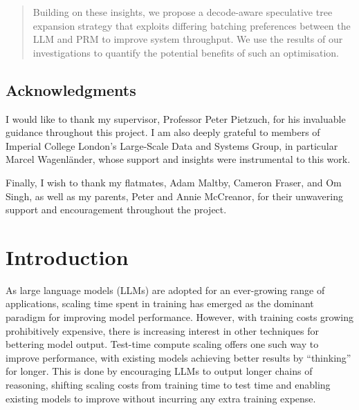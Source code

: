 \documentclass[11pt,twoside]{report}
\begin{document}
\begin{abstract}
Building on these insights, we propose a decode-aware speculative tree expansion strategy that exploits differing batching preferences between the LLM and PRM to improve system throughput.
We use the results of our investigations to quantify the potential benefits of such an optimisation.

\end{abstract}

\cleardoublepage
\section*{Acknowledgments}
I would like to thank my supervisor, Professor Peter Pietzuch, for his invaluable guidance throughout this project.
I am also deeply grateful to members of Imperial College London's Large-Scale Data and Systems Group, in particular Marcel Wagenländer, whose support and insights were instrumental to this work.

Finally, I wish to thank my flatmates, Adam Maltby, Cameron Fraser, and Om Singh, as well as my parents, Peter and Annie McCreanor, for their unwavering support and encouragement throughout the project.

\tableofcontents 


\setcounter{page}{1}
\fancyhead[LE,RO]{\slshape \rightmark}
\fancyhead[LO,RE]{\slshape \leftmark}

\chapter{Introduction} %

As large language models (LLMs) are adopted for an ever-growing range of applications, scaling time spent in training has emerged as the dominant paradigm for improving model performance.
However, with training costs growing prohibitively expensive, there is increasing interest in other techniques for bettering model output. 
Test-time compute scaling offers one such way to improve performance, with existing models achieving better results by ``thinking'' for longer.
This is done by encouraging LLMs to output longer chains of reasoning, shifting scaling costs from training time to test time and enabling existing models to improve without incurring any extra training expense.
\end{document}

